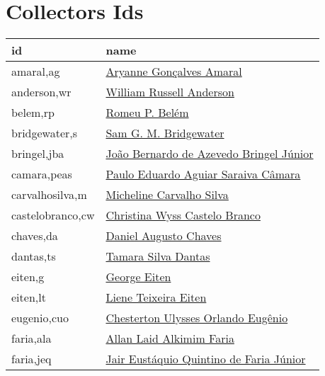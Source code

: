 \chapter{Collectors Ids}\label{appendix:collectors_ids}

\lipsum[50]

\begin{longtable}{l l}
	  id & name \\
      \hline
      amaral,ag           & \hyperlink{http://lattes.cnpq.br/0553088328180564}{Aryanne Gonçalves Amaral} \\
anderson,wr         & \hyperlink{https://plants.jstor.org/stable/10.5555/al.ap.person.bm000000177}{William Russell Anderson} \\
belem,rp            & \hyperlink{https://plants.jstor.org/stable/10.5555/al.ap.person.bm000026951}{Romeu P. Belém} \\
bridgewater,s       & \hyperlink{https://plants.jstor.org/stable/10.5555/al.ap.person.bm000120171}{Sam G. M. Bridgewater} \\
bringel,jba         & \hyperlink{http://lattes.cnpq.br/9359704960057451}{João Bernardo de Azevedo Bringel Júnior} \\
camara,peas         & \hyperlink{http://lattes.cnpq.br/2742831544064073}{Paulo Eduardo Aguiar Saraiva Câmara} \\
carvalhosilva,m     & \hyperlink{http://lattes.cnpq.br/1015868478480965}{Micheline Carvalho Silva} \\
castelobranco,cw    & \hyperlink{http://lattes.cnpq.br/6129052109183586}{Christina Wyss Castelo Branco} \\
chaves,da           & \hyperlink{http://lattes.cnpq.br/6993370381419092}{Daniel Augusto Chaves} \\
dantas,ts           & \hyperlink{http://lattes.cnpq.br/6233687711682398}{Tamara Silva Dantas} \\
eiten,g             & \hyperlink{https://plants.jstor.org/stable/10.5555/al.ap.person.bm000002352}{George Eiten} \\
eiten,lt            & \hyperlink{https://plants.jstor.org/stable/10.5555/al.ap.person.bm000002353}{Liene Teixeira Eiten} \\
eugenio,cuo         & \hyperlink{http://lattes.cnpq.br/3694741825113110}{Chesterton Ulysses Orlando Eugênio} \\
faria,ala           & \hyperlink{http://lattes.cnpq.br/3988533384771339}{Allan Laid Alkimim Faria} \\
faria,jeq           & \hyperlink{http://lattes.cnpq.br/3214384669945455}{Jair Eustáquio Quintino de Faria Júnior} \\

\end{longtable}
